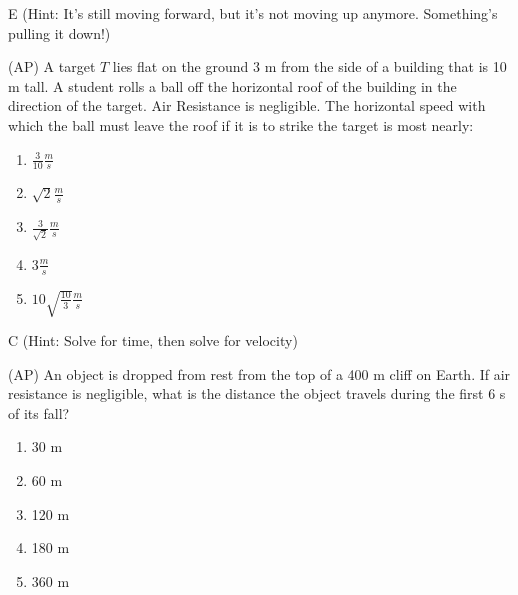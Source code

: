 \begin{solution}
E (Hint: It's still moving forward, but it's not moving up anymore. Something's pulling it down!)
\end{solution}


\begin{question}
(AP) A target $T$ lies flat on the ground 3 m from the side of a building that  is 10 m tall. A student rolls a ball off the horizontal roof of the building in the direction of the target. Air Resistance is negligible. The horizontal speed with which the ball must leave the roof if it is to strike the target is most nearly:

\begin{multicols}{5}
\begin{enumerate}[label=(\alph*)]
    \item $\frac{3}{10}\frac{m}{s}$
    \item $\sqrt{2}\frac{m}{s}$
    \item $\frac{3}{\sqrt{2}}\frac{m}{s}$
    \item $3\frac{m}{s}$
    \item $10\sqrt{\frac{10}{3}}\frac{m}{s}$
\end{enumerate}
\end{multicols}

\end{question}

\begin{solution}
C (Hint: Solve for time, then solve for velocity)
\end{solution}


\begin{question}
(AP) An object is dropped from rest from the top of a 400 m cliff on Earth. If air resistance is negligible, what is the distance the object travels during the first 6 s of its fall?

\begin{multicols}{5}
\begin{enumerate}[label=(\alph*)]
    \item 30 m
    \item 60 m
    \item 120 m
    \item 180 m
    \item 360 m
\end{enumerate}
\end{multicols}

\end{question}

